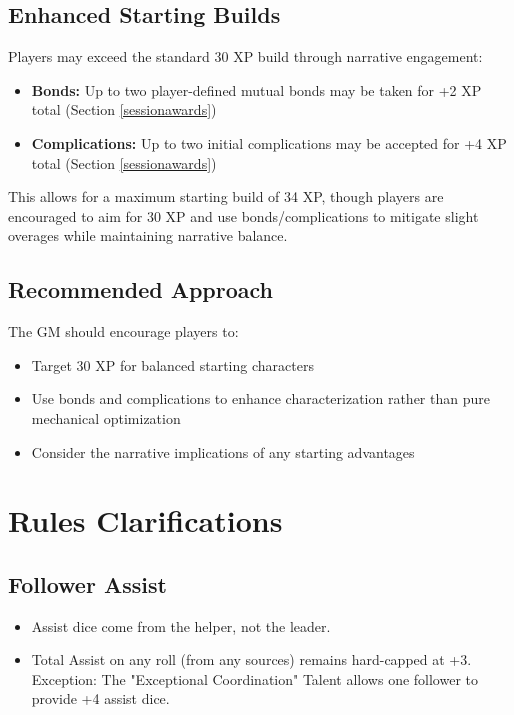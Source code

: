 \documentclass[11pt]{article}
\begin{document}
\subsection{Enhanced Starting Builds}
Players may exceed the standard 30 XP build through narrative engagement:

\begin{itemize}
    \item \textbf{Bonds:} Up to two player-defined mutual bonds may be taken for +2 XP total (Section \ref{sessionawards})
    \item \textbf{Complications:} Up to two initial complications may be accepted for +4 XP total (Section \ref{sessionawards})
\end{itemize}

This allows for a maximum starting build of 34 XP, though players are encouraged to aim for 30 XP and use bonds/complications to mitigate slight overages while maintaining narrative balance.

\subsection{Recommended Approach}
The GM should encourage players to:
\begin{itemize}
    \item Target 30 XP for balanced starting characters
    \item Use bonds and complications to enhance characterization rather than pure mechanical optimization
    \item Consider the narrative implications of any starting advantages
\end{itemize}

\section{Rules Clarifications}

\subsection{Follower Assist}
\begin{itemize}
    \item Assist dice come from the helper, not the leader.
    \item Total Assist on any roll (from any sources) remains hard-capped at +3. Exception: The "Exceptional Coordination" Talent allows one follower to provide +4 assist dice.
\end{itemize}
\end{document}
